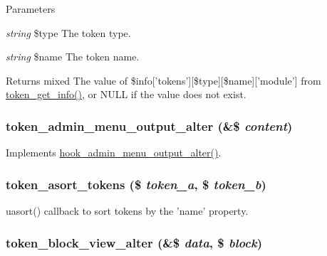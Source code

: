 \begin{DoxyParams}{Parameters}
\item[{\em string}]\$type The token type. \item[{\em string}]\$name The token name.\end{DoxyParams}
\begin{DoxyReturn}{Returns}
mixed The value of \$info\mbox{[}'tokens'\mbox{]}\mbox{[}\$type\mbox{]}\mbox{[}\$name\mbox{]}\mbox{[}'module'\mbox{]} from \hyperlink{token_8module_a5f133651e755907cb560b5860d44d2c2}{token\_\-get\_\-info()}, or NULL if the value does not exist. 
\end{DoxyReturn}
\hypertarget{token_8module_af16254da9d5310f0c54f5f9ceabd7891}{
\subsubsection[{token\_\-admin\_\-menu\_\-output\_\-alter}]{\setlength{\rightskip}{0pt plus 5cm}token\_\-admin\_\-menu\_\-output\_\-alter (\&\$ {\em content})}}
\label{token_8module_af16254da9d5310f0c54f5f9ceabd7891}
Implements \hyperlink{admin__menu_8api_8php_a7502be228e9b3e1a04cbc17fa0e42b25}{hook\_\-admin\_\-menu\_\-output\_\-alter()}. \hypertarget{token_8module_aeb176989ed28ca8726654d28720e782e}{
\subsubsection[{token\_\-asort\_\-tokens}]{\setlength{\rightskip}{0pt plus 5cm}token\_\-asort\_\-tokens (\$ {\em token\_\-a}, \/  \$ {\em token\_\-b})}}
\label{token_8module_aeb176989ed28ca8726654d28720e782e}
uasort() callback to sort tokens by the 'name' property. \hypertarget{token_8module_a5e30af58ef42a9fb1b3d3723e2796c9d}{
\subsubsection[{token\_\-block\_\-view\_\-alter}]{\setlength{\rightskip}{0pt plus 5cm}token\_\-block\_\-view\_\-alter (\&\$ {\em data}, \/  \$ {\em block})}}
